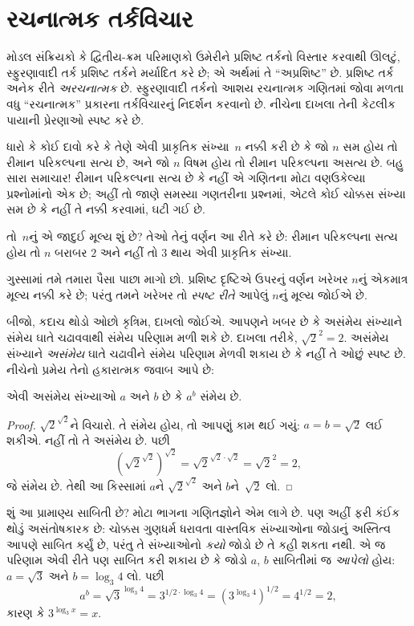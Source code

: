 \documentclass[../../../include/open-logic-chapter]{subfiles}
\begin{document}

\section{રચનાત્મક તર્કવિચાર}

મોડલ સંક્રિયકો કે દ્વિતીય-ક્રમ પરિમાણકો ઉમેરીને પ્રશિષ્ટ તર્કનો
વિસ્તાર કરવાથી ઊલટું, સ્ફુરણાવાદી તર્ક પ્રશિષ્ટ તર્કને મર્યાદિત
કરે છે; એ અર્થમાં તે ``અપ્રશિષ્ટ'' છે. પ્રશિષ્ટ તર્ક અનેક રીતે
\emph{અરચનાત્મક} છે. સ્ફુરણાવાદી તર્કનો આશય રચનાત્મક ગણિતમાં
જોવા મળતા વધુ ``રચનાત્મક'' પ્રકારના તર્કવિચારનું નિદર્શન કરવાનો
છે. નીચેના દાખલા તેની કેટલીક પાયાની પ્રેરણાઓ સ્પષ્ટ કરે છે.

ધારો કે કોઈ દાવો કરે કે તેણે એવી પ્રાકૃતિક સંખ્યા~$n$ નક્કી
કરી છે કે જો $n$ સમ હોય તો રીમાન પરિકલ્પના સત્ય છે, અને જો
$n$ વિષમ હોય તો રીમાન પરિકલ્પના અસત્ય છે. બહુ સારા સમાચાર!{}
રીમાન પરિકલ્પના સત્ય છે કે નહીં એ ગણિતના મોટા વણઉકેલ્યા
પ્રશ્નોમાંનો એક છે; અહીં તો જાણે સમસ્યા ગણતરીના પ્રશ્નમાં,
એટલે કોઈ ચોક્કસ સંખ્યા સમ છે કે નહીં તે નક્કી કરવામાં, ઘટી
ગઈ છે.

તો~$n$નું એ જાદુઈ મૂલ્ય શું છે? તેઓ તેનું વર્ણન આ રીતે કરે છે:
રીમાન પરિકલ્પના સત્ય હોય તો $n$ બરાબર $2$ અને નહીં તો $3$
થાય એવી પ્રાકૃતિક સંખ્યા.

ગુસ્સામાં તમે તમારા પૈસા પાછા માગો છો. પ્રશિષ્ટ દૃષ્ટિએ ઉપરનું
વર્ણન ખરેખર $n$નું એકમાત્ર મૂલ્ય નક્કી કરે છે; પરંતુ તમને
ખરેખર તો \emph{સ્પષ્ટ રીતે} આપેલું $n$નું મૂલ્ય જોઈએ છે.

બીજો, કદાચ થોડો ઓછો કૃત્રિમ, દાખલો જોઈએ. આપણને ખબર છે કે
અસંમેય સંખ્યાને સંમેય ઘાતે ચઢાવવાથી સંમેય પરિણામ મળી શકે છે.
દાખલા તરીકે, $\sqrt{2}^2 = 2$. અસંમેય સંખ્યાને
\emph{અસંમેય} ઘાતે ચઢાવીને સંમેય પરિણામ મેળવી શકાય છે કે
નહીં તે ઓછું સ્પષ્ટ છે. નીચેનો પ્રમેય તેનો હકારાત્મક જવાબ
આપે છે:

\begin{thm}
એવી અસંમેય સંખ્યાઓ $a$ અને $b$ છે કે $a^b$ સંમેય છે.
\end{thm}

\begin{proof}
$\sqrt{2}^{\sqrt{2}}$ને વિચારો. તે સંમેય હોય, તો આપણું કામ
થઈ ગયું: $a = b = \sqrt{2}$ લઈ શકીએ. નહીં તો તે અસંમેય છે.
પછી
\[
(\sqrt{2}^{\sqrt{2}})^{\sqrt{2}} = \sqrt{2}^{\sqrt{2} \cdot
  \sqrt{2}} = \sqrt{2}^2 = 2,
\]
જે સંમેય છે. તેથી આ કિસ્સામાં $a$ને
$\sqrt{2}^{\sqrt{2}}$ અને $b$ને~$\sqrt 2$ લો.
\end{proof}

શું આ પ્રામાણ્ય સાબિતી છે? મોટા ભાગના ગણિતજ્ઞોને એમ લાગે છે.
પણ અહીં ફરી કંઈક થોડું અસંતોષકારક છે: ચોક્કસ ગુણધર્મ ધરાવતા
વાસ્તવિક સંખ્યાઓના જોડાનું અસ્તિત્વ આપણે સાબિત કર્યું છે,
પરંતુ તે સંખ્યાઓનો \emph{કયો} જોડો છે તે કહી શકતા નથી. એ જ
પરિણામ એવી રીતે પણ સાબિત કરી શકાય છે કે જોડો $a$, $b$
સાબિતીમાં જ \emph{આપેલો} હોય: $a = \sqrt{3}$ અને
$b = \log_3 4$ લો. પછી
\[
a^b = \sqrt{3}^{\log_3 4} = 3^{1/2 \cdot \log_3 4} = (3^{\log_3
  4})^{1/2} = 4^{1/2}= 2,
\]
કારણ કે $3^{\log_3 x} = x$.
\end{document}

